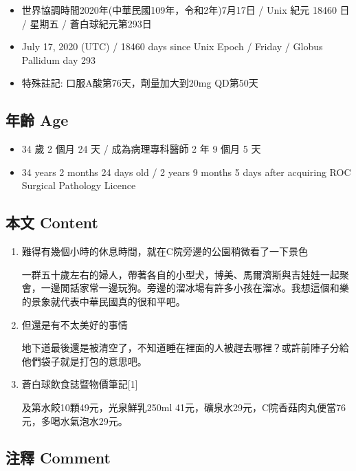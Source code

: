 \documentclass[a5paper, 11pt
]{book}
\providecommand{\tightlist}{%
  \setlength{\itemsep}{0pt}\setlength{\parskip}{0pt}}
\begin{document}
\begin{itemize}
\tightlist
\item
  世界協調時間2020年(中華民國109年，令和2年)7月17日 / Unix 紀元 18460 日
  / 星期五 / 蒼白球紀元第293日
\item
  July 17, 2020 (UTC) / 18460 days since Unix Epoch / Friday / Globus
  Pallidum day 293
\item
  特殊註記: 口服A酸第76天，劑量加大到20mg QD第50天
\end{itemize}

\hypertarget{ux5e74ux9f61-age-46}{%
\subsection{年齡 Age}\label{ux5e74ux9f61-age-46}}

\begin{itemize}
\tightlist
\item
  34 歲 2 個月 24 天 / 成為病理專科醫師 2 年 9 個月 5 天
\item
  34 years 2 months 24 days old / 2 years 9 months 5 days after
  acquiring ROC Surgical Pathology Licence
\end{itemize}

\hypertarget{ux672cux6587-content-46}{%
\subsection{本文 Content}\label{ux672cux6587-content-46}}

\begin{enumerate}
\def\labelenumi{\arabic{enumi}.}
\item
  難得有幾個小時的休息時間，就在C院旁邊的公園稍微看了一下景色

  一群五十歲左右的婦人，帶著各自的小型犬，博美、馬爾濟斯與吉娃娃一起聚會，一邊閒話家常一邊玩狗。旁邊的溜冰場有許多小孩在溜冰。我想這個和樂的景象就代表中華民國真的很和平吧。
\item
  但還是有不太美好的事情

  地下道最後還是被清空了，不知道睡在裡面的人被趕去哪裡？或許前陣子分給他們袋子就是打包的意思吧。
\item
  蒼白球飲食誌暨物價筆記{[}1{]}

  及第水餃10顆49元，光泉鮮乳250ml
  41元，礦泉水29元，C院香菇肉丸便當76元，多喝水氣泡水29元。
\end{enumerate}

\hypertarget{ux6ce8ux91cb-comment-46}{%
\subsection{注釋 Comment}\label{ux6ce8ux91cb-comment-46}}
\end{document}

